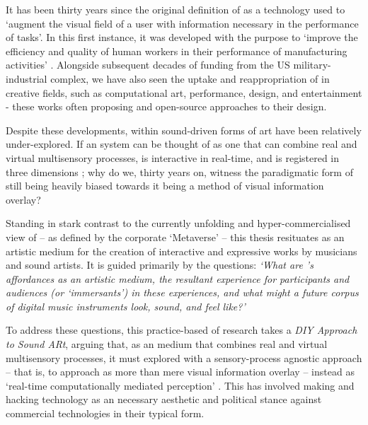 \begin{SingleSpace}
    It has been thirty years since the original definition of  as a technology used to `augment the visual field of a user with information necessary in the performance of tasks'. In this first instance, it was developed with the purpose to `improve the efficiency and quality of human workers in their performance of manufacturing activities' \citep{caudell1992}. Alongside subsequent decades of funding from the US military-industrial complex, we have also seen the uptake and reappropriation of  in creative fields, such as computational art, performance, design, and entertainment - these works often proposing  and open-source approaches to their design. 

    Despite these developments,  within sound-driven forms of art have been relatively under-explored. If an  system can be thought of as one that can combine real and virtual multisensory processes, is interactive in real-time, and is registered in three dimensions \citep{azuma1997}; why do we, thirty years on, witness the paradigmatic form of  still being heavily biased \citep{billinghurst2015} towards it being a method of visual information overlay?
    
    Standing in stark contrast to the currently unfolding and hyper-commercialised view of  -- as defined by the corporate `Metaverse' -- this thesis resituates  as an artistic medium for the creation of interactive and expressive works by musicians and sound artists. It is guided primarily by the questions: \textit{`What are 's affordances as an artistic medium, the resultant experience for participants and audiences (or `immersants') in these experiences, and what might a future corpus of  digital music instruments look, sound, and feel like?'}
    
    To address these questions, this practice-based of research takes a \textit{DIY Approach to Sound ARt}, arguing that, as an medium that combines real and virtual multisensory processes, it must explored with a sensory-process agnostic approach -- that is, to approach  as more than mere visual information overlay -- instead as `real-time computationally mediated perception' \citep{chevalier2020}. This has involved making and hacking technology as an necessary aesthetic and political stance against commercial  technologies in their typical form.
    

\end{SingleSpace}
